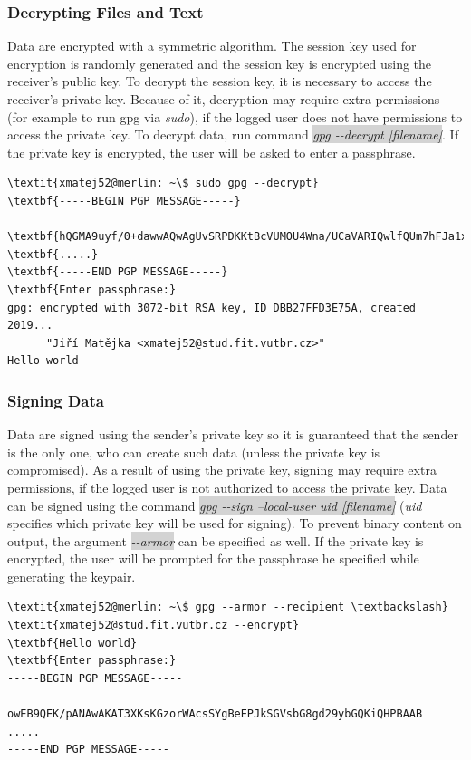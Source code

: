 \subsubsection*{Decrypting Files and Text}
Data are encrypted with a symmetric algorithm. The session key used for encryption is randomly generated and the session key is encrypted using the receiver's public key. To decrypt the session key, it is necessary to access the receiver's private key. Because of it, decryption may require extra permissions (for example to run gpg via \textit{sudo}), if the logged user does not have permissions to access the private key. To decrypt data, run command \colorbox{lightgray}{\textit{gpg -{}-decrypt [filename]}}. If the private key is encrypted, the user will be asked to enter a passphrase.
\begin{Verbatim}[commandchars=\\\{\},codes={\catcode`$=3\catcode`_=8},samepage=false,frame=single]
\textit{xmatej52@merlin: ~\$ sudo gpg --decrypt}
\textbf{-----BEGIN PGP MESSAGE-----}

\textbf{hQGMA9uyf/0+dawwAQwAgUvSRPDKKtBcVUMOU4Wna/UCaVARIQwlfQUm7hFJa1xp}
\textbf{.....}
\textbf{-----END PGP MESSAGE-----}
\textbf{Enter passphrase:}
gpg: encrypted with 3072-bit RSA key, ID DBB27FFD3E75A, created 2019...
      "Jiří Matějka <xmatej52@stud.fit.vutbr.cz>"
Hello world
\end{Verbatim}

\subsubsection*{Signing Data}
Data are signed using the sender's private key so it is guaranteed that the sender is the only one, who can create such data (unless the private key is compromised). As a result of using the private key, signing may require extra permissions, if the logged user is not authorized to access the private key. Data can be signed using the command \colorbox{lightgray}{\textit{gpg -{}-sign --local-user uid [filename]}} (\textit{uid} specifies which private key will be used for signing). To prevent binary content on output, the argument \colorbox{lightgray}{\textit{-{}-armor}} can be specified as well. If the private key is encrypted, the user will be prompted for the passphrase he specified while generating the keypair.
\begin{Verbatim}[commandchars=\\\{\},codes={\catcode`$=3\catcode`_=8},samepage=false,frame=single]
\textit{xmatej52@merlin: ~\$ gpg --armor --recipient \textbackslash}
\textit{xmatej52@stud.fit.vutbr.cz --encrypt}
\textbf{Hello world}
\textbf{Enter passphrase:}
-----BEGIN PGP MESSAGE-----

owEB9QEK/pANAwAKAT3XKsKGzorWAcsSYgBeEPJkSGVsbG8gd29ybGQKiQHPBAAB
.....
-----END PGP MESSAGE-----
\end{Verbatim}

